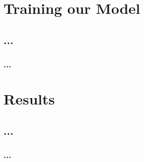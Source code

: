 \documentclass[
	11pt, %
]{beamer}
\begin{document}
\section{Training our Model}
\subsection{...}

\begin{frame}
	\frametitle{...}
\end{frame}
\section{Results}
\subsection{...}
\begin{frame}
	\frametitle{...}
\end{frame}
\end{document}
